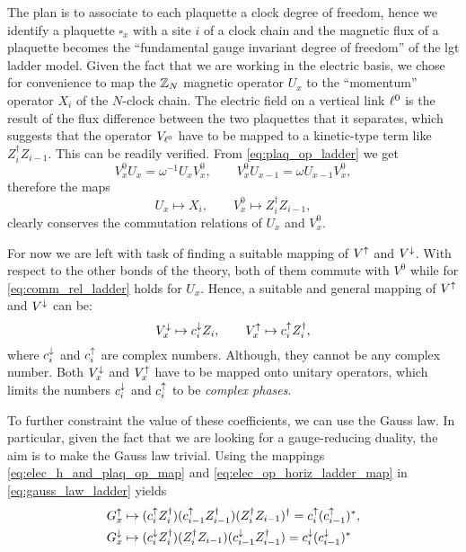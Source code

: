 The plan is to associate to each plaquette a clock degree of freedom, hence we identify a plaquette $\square_x$ with a site $i$ of a clock chain and the magnetic flux of a plaquette becomes the ``fundamental gauge invariant degree of freedom'' of the \ac{lgt} ladder model.
Given the fact that we are working in the electric basis, we chose for convenience to map the $\mathbb{Z}_N$ magnetic operator $U_x$ to the ``momentum'' operator $X_i$ of the $N$-clock chain.
The electric field on a vertical link $\ell^0$ is the result of the flux difference between the two plaquettes that it separates, which suggests that the operator $V_{\ell^0}$ have to be mapped to a kinetic-type term like $Z_i^\dagger Z_{i-1}$.
This can be readily verified.
From \eqref{eq:plaq_op_ladder} we get
\begin{equation*}
    V^0_x U_x = \omega^{-1} U_x V_x^0, \qquad
    V^0_x U_{x-1} = \omega U_{x-1} V_x^0,
\end{equation*}
therefore the maps
\begin{equation*}
    U_x \mapsto X_i, \qquad
    V^0_x \mapsto Z_i^\dagger Z_{i-1},
    \label{eq:elec_h_and_plaq_op_map}
\end{equation*}
clearly conserves the commutation relations of $U_x$ and $V^0_x$.

For now we are left with task of finding a suitable mapping of $V^{\uparrow}$ and $V^{\downarrow}$.
With respect to the other bonds of the theory, both of them commute with $V^0$ while for \eqref{eq:comm_rel_ladder} holds for $U_x$.
Hence, a suitable and general mapping of $V^{\uparrow}$ and $V^{\downarrow}$ can be:
\begin{equation}
    V^{\downarrow}_x \mapsto c^{\downarrow}_i Z_i, \qquad
    V^{\uparrow}_x \mapsto c^{\uparrow}_i Z_i^\dagger,
    \label{eq:elec_op_horiz_ladder_map}
\end{equation}
where $c^{\downarrow}_i$ and $c^{\uparrow}_i$ are complex numbers.
Although, they cannot be any complex number.
Both $V^{\downarrow}_x$ and $V^{\uparrow}_x$ have to be mapped onto unitary operators, which limits the numbers $c^{\downarrow}_i$ and $c^{\uparrow}_i$ to be \emph{complex phases}.

To further constraint the value of these coefficients, we can use the Gauss law.
In particular, given the fact that we are looking for a gauge-reducing duality, the aim is to make the Gauss law trivial.
Using the mappings \eqref{eq:elec_h_and_plaq_op_map} and \eqref{eq:elec_op_horiz_ladder_map} in \eqref{eq:gauss_law_ladder} yields
\begin{equation}
    \begin{split}
        G^\uparrow_x & \mapsto
        (c^{\uparrow}_i Z_i^\dagger) (c^{\uparrow}_{i-1} Z_{i-1}^\dagger) (Z_i^\dagger Z_{i-1})^\dagger
        = c^{\uparrow}_i (c^{\uparrow}_{i-1})^*, \\
        G^\downarrow_x & \mapsto
        (c^{\downarrow}_i Z_i^\dagger) (Z_i^\dagger Z_{i-1}) (c^{\downarrow}_{i-1} Z_{i-1}^\dagger)
        = c^{\downarrow}_i (c^{\downarrow}_{i-1})^*
    \end{split}
    \label{eq:gauss_law_map_ladder}
\end{equation}

